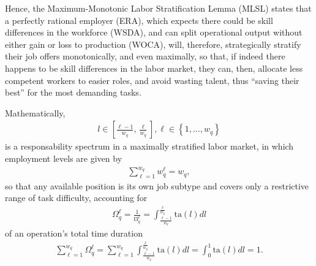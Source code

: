 \documentclass[hidelinks, nonatbib]{elsarticle}
\begin{document}
\begin{enumerate}
\begin{enumerate}
\begin{enumerate}
            Hence, the Maximum-Monotonic Labor Stratification Lemma (MLSL) states that a perfectly rational employer (ERA), which expects there could be skill differences in the workforce (WSDA), and can split operational output without either gain or loss to production (WOCA), will, therefore, strategically stratify their job offers monotonically, and even maximally, so that, if indeed there happens to be skill differences in the labor market, they can, then, allocate less competent workers to easier roles, and avoid wasting talent, thus ``saving their best'' for the most demanding tasks.
            
            Mathematically,
            \begin{gather}
                l \in \left[
                \frac{\ell - 1}{w_q}
                ,
                \frac{\ell}{w_q}
                \right]
                ,
                \ell \in 
                \left\{
                    1, \dots, w_q
                \right\}
            \end{gather}
            is a responsability spectrum in a maximally stratified labor market, in which employment levels are given by
            \begin{gather}
                \sum_{\ell=1}^{w_q}
                w_{q}^{\ell}
                =
                w_q
                ,
            \end{gather}
            so that any available position is its own job subtype and covers only a restrictive range of task difficulty, accounting for
            \begin{gather}
                \Omega_{q}^{\ell} = 
                \frac{1}{\mho_{q}^{\ell}} = 
                \int_{
                    \frac{\ell - 1}{w_q}
                }^{
                    \frac{\ell}{w_q}
                }
                \text{ta}(l)dl
            \end{gather}
            of an operation's total time duration
            \begin{gather}
                \sum_{\ell=1}^{w_q}
                \Omega_{q}^{\ell} 
                = 
                \sum_{\ell=1}^{w_q}
                \int_{
                    \frac{\ell - 1}{w_q}
                }^{
                    \frac{\ell}{w_q}
                }
                \text{ta}(l)dl
                =
                \int_{0}^{1}
                \text{ta}(l)dl
                =
                1
                .
            \end{gather}


\end{enumerate}
\end{enumerate}
\end{enumerate}
\end{document}
